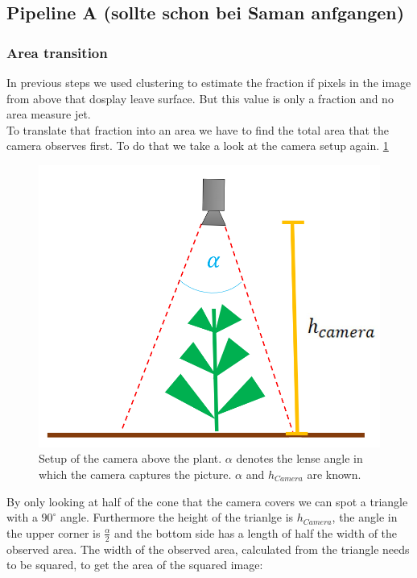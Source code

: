 \graphicspath{{members/tf/figures/}}

\subsection{Pipeline A (sollte schon bei Saman anfgangen)}

\subsubsection{Area transition}
In previous steps we used clustering to estimate the fraction if pixels in the image from above that dosplay leave surface. But this value is only a fraction and no area measure jet.\\
To translate that fraction into an area we have to find the total area that the camera observes first. To do that we take a look at the camera setup again. \ref{fig:setupAbove}
   \begin{figure}[H]
       \centering
       \includegraphics[scale=0.6]{setupAbove.PNG}
       \caption{Setup of the camera above the plant. $\alpha$ denotes the lense angle in which the camera captures the picture. $\alpha$ and $h_{Camera}$ are known.}
       \label{fig:setupAbove}
   \end{figure}{}
By only looking at half of the cone that the camera covers we can spot a triangle with a $90^{\circ}$ angle. Furthermore the height of the trianlge is $h_{Camera}$, the angle in the upper corner is $\frac{\alpha}{2}$ and the bottom side has a length of half the width of the observed area. The width of the observed area, calculated from the triangle needs to be squared, to get the area of the squared image:\\
